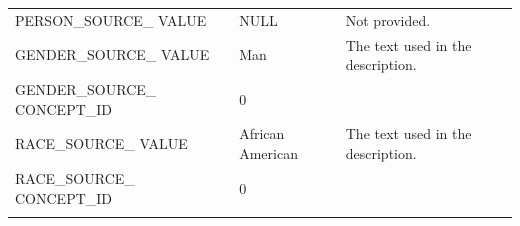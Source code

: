 \documentclass[10.5pt]{book}
\theoremstyle{definition}
\theoremstyle{definition}
\theoremstyle{definition}
\theoremstyle{remark}
\begin{document}
\begin{longtable}[]{@{}lll@{}}
\begin{minipage}[t]{0.28\columnwidth}
PERSON\_SOURCE\_ VALUE\strut
\end{minipage} & \begin{minipage}[t]{0.16\columnwidth}\raggedright\strut
NULL\strut
\end{minipage} & \begin{minipage}[t]{0.48\columnwidth}\raggedright\strut
Not provided.\strut
\end{minipage}\tabularnewline
\begin{minipage}[t]{0.28\columnwidth}\raggedright\strut
GENDER\_SOURCE\_ VALUE\strut
\end{minipage} & \begin{minipage}[t]{0.16\columnwidth}\raggedright\strut
Man\strut
\end{minipage} & \begin{minipage}[t]{0.48\columnwidth}\raggedright\strut
The text used in the description.\strut
\end{minipage}\tabularnewline
\begin{minipage}[t]{0.28\columnwidth}\raggedright\strut
GENDER\_SOURCE\_ CONCEPT\_ID\strut
\end{minipage} & \begin{minipage}[t]{0.16\columnwidth}\raggedright\strut
0\strut
\end{minipage} & \begin{minipage}[t]{0.48\columnwidth}\raggedright\strut
\strut
\end{minipage}\tabularnewline
\begin{minipage}[t]{0.28\columnwidth}\raggedright\strut
RACE\_SOURCE\_ VALUE\strut
\end{minipage} & \begin{minipage}[t]{0.16\columnwidth}\raggedright\strut
African American\strut
\end{minipage} & \begin{minipage}[t]{0.48\columnwidth}\raggedright\strut
The text used in the description.\strut
\end{minipage}\tabularnewline
\begin{minipage}[t]{0.28\columnwidth}\raggedright\strut
RACE\_SOURCE\_ CONCEPT\_ID\strut
\end{minipage} & \begin{minipage}[t]{0.16\columnwidth}\raggedright\strut
0\strut
\end{minipage} & \begin{minipage}[t]{0.48\columnwidth}\raggedright\strut
\strut
\end{minipage}\tabularnewline
\begin{minipage}[t]{0.28\columnwidth}\raggedright\strut

\end{minipage}
\end{longtable}
\end{document}
